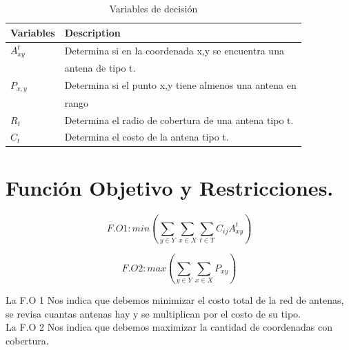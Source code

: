 \documentclass[runningheads]{llncs}
\begin{document}
\begin{table}[h]
	\caption{Variables de decisi\'{o}n}
	\begin{tabular*}{\hsize}{@{\extracolsep{\fill}}ll@{}}
		\hline
		\textbf{Variables} & \textbf{Description}\\
		\hline
		$A_{xy}^t$ & Determina si en la coordenada x,y se encuentra una\\
		& antena de tipo t.\\
		$P_{x,y}$ & Determina si el punto x,y tiene almenos una antena en\\
		& rango\\
		$R_{t}$ &   Determina el radio de cobertura de una antena tipo t.\\
		$C_{t}$  & Determina el costo de la antena tipo t. \\
		\hline
	\end{tabular*}
\end{table}

\newpage
\section{Funci\'{o}n Objetivo y Restricciones.}

\begin{equation}
	F.O 1: min (\sum_{y \in Y} \sum_{x \in X} \sum_{t \in T} C_{ij} A_{xy}^t)
\label{eq:res1}
\end{equation}

\begin{equation}
	F.O 2: max (\sum_{y \in Y} \sum_{x \in X} P_{xy})\label{eq:res2}
\end{equation}


La F.O 1 Nos indica que debemos minimizar el costo total de la red de antenas, se revisa cuantas antenas hay y se multiplican por el costo de su tipo.
\\

La F.O 2 Nos indica que debemos maximizar la cantidad de coordenadas con cobertura.
\\
\\

%
%
%
% 
% 
%
\end{document}
